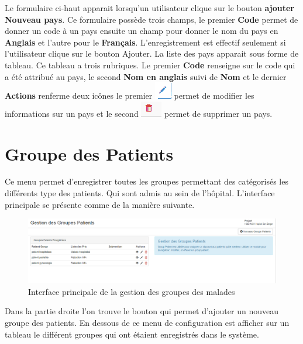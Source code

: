 \documentclass[12pt,a4paper]{report}
\begin{document}
Le formulaire ci-haut apparait lorsqu'un utilisateur clique sur le bouton \textbf{ajouter Nouveau pays}. Ce formulaire possède trois champs, le premier \textbf{Code} permet de donner un code à un pays ensuite un champ pour donner le nom du pays en \textbf{Anglais} et l'autre pour le \textbf{Français}.
L'enregistrement est effectif seulement si l'utilisateur clique sur le bouton Ajouter. La liste des pays apparait sous forme de tableau. Ce tableau a trois rubriques. Le premier \textbf{Code} renseigne sur le code qui a été attribué au pays, le second \textbf{Nom en anglais} suivi de \textbf{Nom}  et le dernier \textbf{Actions} renferme deux icônes le premier \includegraphics[scale=0.7]{pic/EditUser.png}  permet de modifier les informations sur un pays et le second \includegraphics[scale=0.7]{pic/DeleteWRed.png}  permet de supprimer un pays.

\newpage
\section{Groupe des Patients}
Ce menu permet d'enregistrer toutes les groupes permettant des catégorisés les différents type des patients. Qui sont admis au sein de l'hôpital. 
L'interface principale se présente comme de la manière suivante.

\begin{figure}[h]
\begin{center}
\includegraphics[width=14cm]{pic/AdminGroupPatient.png}
\end{center}
\caption{Interface principale de la gestion des groupes des malades}
\label{Interface principale de la gestion des groupes des malades}
\end{figure}

Dans la partie droite l'on trouve le bouton qui permet d'ajouter un nouveau groupe des patients. En dessous de ce menu de configuration est afficher sur un tableau le différent groupes qui ont étaient enregistrés dans le système. 
\end{document}

